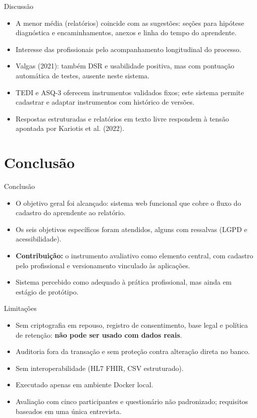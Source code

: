 \documentclass[compress]{beamer}
\begin{document}
\begin{frame}{Discussão}
\begin{itemize}
    \small
    \item A menor média (relatórios) coincide com as sugestões: seções para hipótese diagnóstica e encaminhamentos, anexos e linha do tempo do aprendente.
    \item Interesse das profissionais pelo acompanhamento longitudinal do processo.
    \item Valgas (2021): também DSR e usabilidade positiva, mas com pontuação automática de testes, ausente neste sistema.
    \item TEDI e ASQ-3 oferecem instrumentos validados fixos; este sistema permite cadastrar e adaptar instrumentos com histórico de versões.
    \item Respostas estruturadas e relatórios em texto livre respondem à tensão apontada por Kariotis et al. (2022).
\end{itemize}
\end{frame}

\section{Conclusão}

\begin{frame}{Conclusão}
\begin{itemize}
    \item O objetivo geral foi alcançado: sistema web funcional que cobre o fluxo do cadastro do aprendente ao relatório.
    \item Os seis objetivos específicos foram atendidos, alguns com ressalvas (LGPD e acessibilidade).
    \item \textbf{Contribuição:} o instrumento avaliativo como elemento central, com cadastro pelo profissional e versionamento vinculado às aplicações.
    \item Sistema percebido como adequado à prática profissional, mas ainda em estágio de protótipo.
\end{itemize}
\end{frame}

\begin{frame}{Limitações}
\begin{itemize}
    \small
    \item Sem criptografia em repouso, registro de consentimento, base legal e política de retenção: \textbf{não pode ser usado com dados reais}.
    \item Auditoria fora da transação e sem proteção contra alteração direta no banco.
    \item Sem interoperabilidade (HL7 FHIR, CSV estruturado).
    \item Executado apenas em ambiente Docker local.
    \item Avaliação com cinco participantes e questionário não padronizado; requisitos baseados em uma única entrevista.
\end{itemize}
\end{frame}
\end{document}
